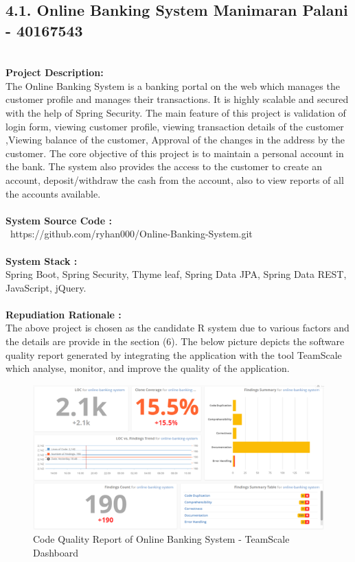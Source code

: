 \documentclass[letterpaper, 11pt]{report}
\begin{document}
\subsection*{4.1. Online Banking System \hfill {\normalsize{Manimaran Palani - 40167543}}} \\
\normalsize {\textbf{Project Description:}} \\
\normalsize {The Online Banking System is a banking portal on the web which manages the customer profile and manages their transactions. It is highly scalable and secured with the help of Spring Security. The main feature of this project is validation of login form, viewing customer proﬁle, viewing transaction details of the customer ,Viewing balance of the customer, Approval of the changes in the address by the customer. The core objective of this project is to maintain a personal account in the bank. The system also provides the access to the customer to create an account, deposit/withdraw the cash from the account, also to view reports of all the accounts available.}\\
\\
\normalsize{\textbf{System Source Code :}} \\
\normalsize{\ https://github.com/ryhan000/Online-Banking-System.git}\\
\\
\normalsize{\textbf{System Stack :}}\\
\normalsize{Spring Boot, Spring Security, Thyme leaf, Spring Data JPA, Spring Data REST, JavaScript, jQuery.}\\
\\
\normalsize{\textbf{Repudiation Rationale : }}\\
\normalsize{The above project is chosen as the candidate R system due to various factors and the details are provide in the section (6). The below picture depicts the software quality report generated by integrating the application with the tool TeamScale which analyse, monitor, and improve the quality of the application.}
\\
\begin{figure}[htb]
\begin{center}
\includegraphics[width=13cm]{D1-Reengineering Opportunity/images/Picture1.png}
\caption{Code Quality Report of Online Banking System - TeamScale Dashboard}
\end{center}
\end{figure}
\pagebreak
{}
\end{document}
